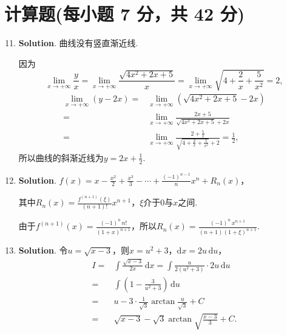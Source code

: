 \documentclass[../main.tex]{subfiles}
\begin{document}
\section{计算题(每小题 7 分，共 42 分)}
\begin{enumerate}
    \setcounter{enumi}{10}
    \item \textbf{Solution}. 曲线没有竖直渐近线.

          因为
          \[
              \lim_{x\to+\infty}\frac{y}{x}=\lim_{x\to+\infty}\frac{\sqrt{4x^{2}+2x+5}}{x}
              =\lim_{x\to+\infty}\sqrt{4+\frac{2}{x}+\frac{5}{x^{2}}}=2,
          \]
          \[
              \begin{aligned}
                  \lim_{x\to+\infty}(y-2x)= {} & \lim_{x\to+\infty}\left(\sqrt{4x^2+2x+5}-2x\right)                                        \\
                  = {}                         & \lim_{x\to+\infty}\frac{2x+5}{\sqrt{4x^2+2x+5}+2x}                                        \\
                  = {}                         & \lim_{x\to+\infty}\frac{2+\frac{5}{x}}{\sqrt{4+\frac{2}{x}+\frac{5}{x^2}}+2}=\frac{1}{2},
              \end{aligned}
          \]
          所以曲线的斜渐近线为$y=2x+\frac{1}{2}$.

    \item \textbf{Solution}. $f(x)=x-\frac{x^{2}}{2}+\frac{x^{3}}{3}-\cdots +
              \frac{(-1)^{n-1}}{n}x^{n}+R_{n}(x)$，

          其中$R_{n}(x)=\frac{f^{(n+1)}(\xi)}{(n+1)!}x^{n+1}$，$\xi$介于$0$与$x$之间.

          由于$f^{(n+1)}(x)=\frac{(-1)^{n}\,n!}{(1+x)^{n+1}}$，所以$R_{n}(x)=\frac{(-1)^{n}\,x^{n+1}}{(n+1)(1+\xi)^{n+1}}$.

    \item \textbf{Solution}. 令$u=\sqrt{x-3}$，则$x=u^{2}+3$，$\mathrm{d}x=2
              u\,\mathrm{d}u$，
          \[
              \begin{aligned}
                  I = {} & \int \frac{\sqrt{x-3}}{2x}\,\mathrm{d}x = \int \frac{u}{2(u^2+3)}\cdot 2u\,\mathrm{d}u \\
                  = {}   & \int \left(1-\frac{3}{u^2+3}\right)\,\mathrm{d}u                                       \\
                  = {}   & u-3\cdot\frac{1}{\sqrt{3}}\arctan\frac{u}{\sqrt{3}}+ C                                 \\
                  = {}   & \sqrt{x-3}-\sqrt{3}\arctan\sqrt{\frac{x-3}{3}}+C.
              \end{aligned}
          \]


\end{enumerate}
\end{document}

